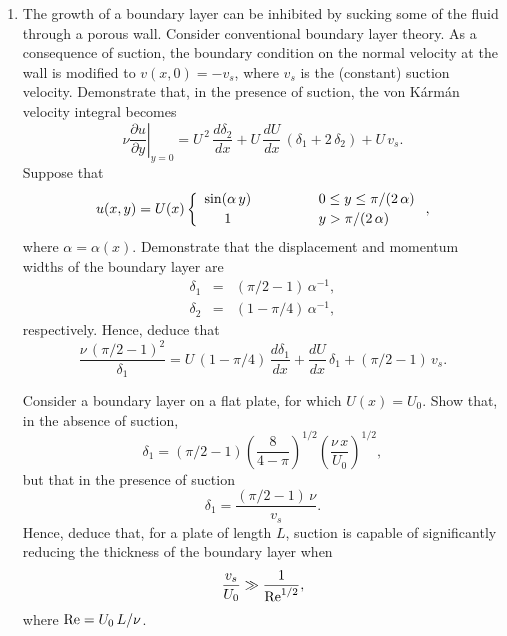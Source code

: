 {\begin{enumerate}
\item The growth of a boundary layer can be inhibited by sucking some of the fluid through a porous wall. 
Consider conventional boundary layer theory. As a consequence
of suction, the boundary condition on the normal velocity at the wall is modified to $v(x,0)=-v_s$, where
$v_s$ is the (constant) suction velocity. Demonstrate that, in the presence of suction, the von K\'{a}rm\'{a}n velocity
integral becomes
$$
\nu\left.\frac{\partial u}{\partial y}\right|_{y=0} = U^{\,2}\,\frac{d\delta_2}{dx} + U\,\frac{dU}{dx}\,(\delta_1+2\,\delta_2) + U\,v_s.
$$
Suppose that
$$
u(x,y) = U(x)\left\{\begin{array}{ccl}
\sin(\alpha\,y)&\mbox{\hspace{1cm}}&0\leq y\leq \pi/(2\,\alpha)\\[0.5ex]
1&&y>\pi/(2\,\alpha)
\end{array}\right.,
$$
where $\alpha=\alpha(x)$. Demonstrate that the displacement and momentum widths of the boundary layer are
\begin{eqnarray}
\delta_1&=&(\pi/2-1)\,\alpha^{-1},\nonumber\\[0.5ex]
\delta_2&=&(1-\pi/4)\,\alpha^{-1},\nonumber
\end{eqnarray}
respectively. 
Hence, deduce that
$$
\frac{\nu\,(\pi/2-1)^2}{\delta_1} = U\,(1-\pi/4)\,\frac{d\delta_1}{dx} + \frac{dU}{dx}\,\delta_1+(\pi/2-1)\,v_s.
$$

Consider a boundary layer on a flat plate, for which $U(x)=U_0$. Show that, in the absence of suction,
$$
\delta_1 = (\pi/2-1)\left(\frac{8}{4-\pi}\right)^{1/2}\left(\frac{\nu\,x}{U_0}\right)^{1/2},
$$
but that in the presence of suction
$$
\delta_1 = \frac{(\pi/2-1)\,\nu}{v_s}.
$$
Hence, deduce that, for a plate of length $L$, suction is capable of significantly reducing the thickness of the
boundary layer when
$$
\frac{v_s}{U_0}\gg \frac{1}{{\rm Re}^{1/2}},
$$
where ${\rm Re} = U_0\,L/\nu$. 
\end{enumerate}}
